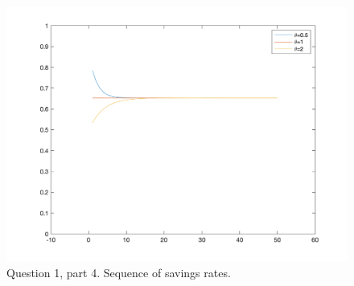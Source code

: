 \documentclass[10pt,letter]{article}
\begin{document}
\begin{figure}
\centering
\includegraphics[scale=0.8]{ps1q1fig5}
\caption{Question 1, part 4. Sequence of savings rates.}
\end{figure}


\pagebreak
\end{document}
